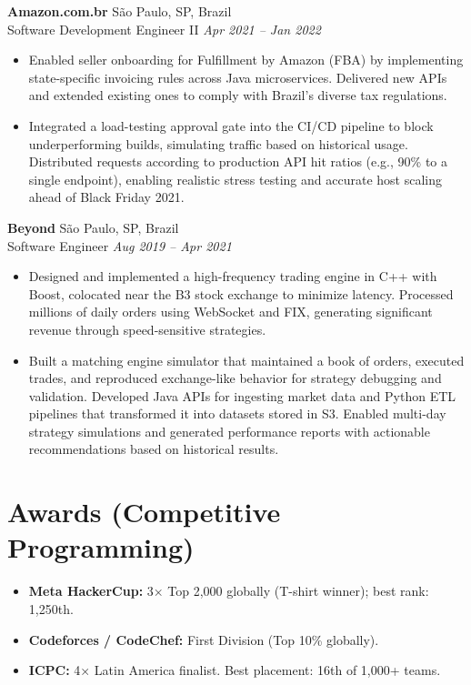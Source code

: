 \documentclass[a4paper,10pt]{article}
\begin{document}
\textbf{Amazon.com.br}
    \hfill São Paulo, SP, Brazil 
    \\ Software Development Engineer II 
    \hfill \textit{Apr 2021 – Jan 2022}
\begin{itemize}
    \item Enabled seller onboarding for Fulfillment by Amazon (FBA) by implementing state-specific invoicing rules across Java microservices. Delivered new APIs and extended existing ones to comply with Brazil’s diverse tax regulations.
    \item Integrated a load-testing approval gate into the CI/CD pipeline to block underperforming builds, simulating traffic based on historical usage. Distributed requests according to production API hit ratios (e.g., 90\% to a single endpoint), enabling realistic stress testing and accurate host scaling ahead of Black Friday 2021.
\end{itemize}

\textbf{Beyond}
    \hfill São Paulo, SP, Brazil 
    \\ Software Engineer
    \hfill \textit{Aug 2019 – Apr 2021}
\begin{itemize}
    \item Designed and implemented a high-frequency trading engine in C++ with Boost, colocated near the B3 stock exchange to minimize latency. Processed millions of daily orders using WebSocket and FIX, generating significant revenue through speed-sensitive strategies.
    \item Built a matching engine simulator that maintained a book of orders, executed trades, and reproduced exchange-like behavior for strategy debugging and validation. Developed Java APIs for ingesting market data and Python ETL pipelines that transformed it into datasets stored in S3. Enabled multi-day strategy simulations and generated performance reports with actionable recommendations based on historical results.
\end{itemize}

\section*{Awards (Competitive Programming)}
\begin{itemize}
    \item \textbf{Meta HackerCup:} 3× Top 2,000 globally (T-shirt winner); best rank: 1,250th.
    \item \textbf{Codeforces / CodeChef:} First Division (Top 10\% globally).
    \item \textbf{ICPC:} 4× Latin America finalist. Best placement: 16th of 1,000+ teams.
\end{itemize}
\end{document}
